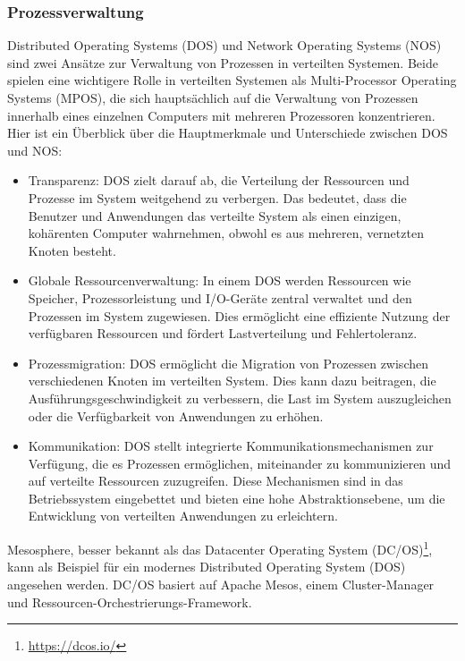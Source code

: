 \subsubsection{Prozessverwaltung}
Distributed Operating Systems (DOS) und Network Operating Systems (NOS) sind zwei Ansätze zur Verwaltung von Prozessen in verteilten Systemen. Beide spielen eine wichtigere Rolle in verteilten Systemen als Multi-Processor Operating Systems (MPOS), die sich hauptsächlich auf die Verwaltung von Prozessen innerhalb eines einzelnen Computers mit mehreren Prozessoren konzentrieren. Hier ist ein Überblick über die Hauptmerkmale und Unterschiede zwischen DOS und NOS:
\begin{itemize}
\item Transparenz: DOS zielt darauf ab, die Verteilung der Ressourcen und Prozesse im System weitgehend zu verbergen. Das bedeutet, dass die Benutzer und Anwendungen das verteilte System als einen einzigen, kohärenten Computer wahrnehmen, obwohl es aus mehreren, vernetzten Knoten besteht.
\item Globale Ressourcenverwaltung: In einem DOS werden Ressourcen wie Speicher, Prozessorleistung und I/O-Geräte zentral verwaltet und den Prozessen im System zugewiesen. Dies ermöglicht eine effiziente Nutzung der verfügbaren Ressourcen und fördert Lastverteilung und Fehlertoleranz.
\item Prozessmigration: DOS ermöglicht die Migration von Prozessen zwischen verschiedenen Knoten im verteilten System. Dies kann dazu beitragen, die Ausführungsgeschwindigkeit zu verbessern, die Last im System auszugleichen oder die Verfügbarkeit von Anwendungen zu erhöhen.
\item Kommunikation: DOS stellt integrierte Kommunikationsmechanismen zur Verfügung, die es Prozessen ermöglichen, miteinander zu kommunizieren und auf verteilte Ressourcen zuzugreifen. Diese Mechanismen sind in das Betriebssystem eingebettet und bieten eine hohe Abstraktionsebene, um die Entwicklung von verteilten Anwendungen zu erleichtern.
\end{itemize}

Mesosphere, besser bekannt als das Datacenter Operating System (DC/OS)\footnote{\url{https://dcos.io/}}, kann als Beispiel für ein modernes Distributed Operating System (DOS) angesehen werden. DC/OS basiert auf Apache Mesos, einem Cluster-Manager und Ressourcen-Orchestrierungs-Framework.

